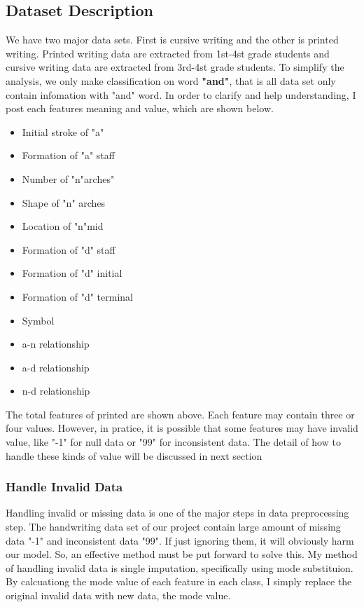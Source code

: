 \documentclass{article}
\begin{document}
\subsection{Dataset Description}
We have two major data sets. First is cursive writing and the other is printed writing.
Printed writing data are extracted from 1st-4st grade students and cursive writing data 
are extracted from 3rd-4st grade students. To simplify the analysis, we only make classification
on word \textbf{"and"}, that is all data set only contain infomation with "and" word.
In order to clarify and help understanding, I post each features meaning and value, which are shown
below.
\begin{itemize}
\item Initial stroke of "a"
\item Formation of "a" staff
\item Number of "n"arches" 
\item Shape of "n" arches
\item Location of "n"mid
\item Formation of "d" staff
\item Formation of "d" initial
\item Formation of "d" terminal
\item Symbol
\item a-n relationship
\item a-d relationship
\item n-d relationship
\end{itemize}

The total features of printed are shown above. Each feature may contain three or
four values. However, in pratice, it is possible that some features may have
invalid value, like "-1" for null data or "99" for inconsistent data. The detail
of how to handle these kinds of value will be discussed in next section
\subsubsection{Handle Invalid Data}
Handling invalid or missing data is one of the major steps in data preprocessing
step. The handwriting data set of our project contain large amount of missing data
"-1" and inconsistent data "99". If just ignoring them, it will obviously harm our
model. So, an effective method must be put forward to solve this.
My method of handling invalid data is single imputation, specifically using mode
substituion. By calcuationg the mode value of each feature in each class, I simply
replace the original invalid data with new data, the mode value.
\end{document}
